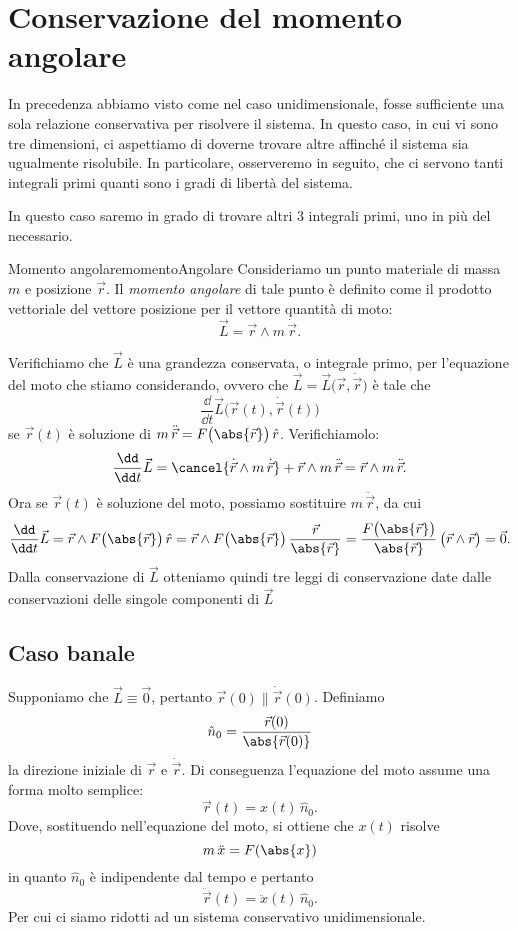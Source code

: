 \section{Conservazione del momento angolare}

In precedenza abbiamo visto come nel caso unidimensionale, fosse sufficiente una sola relazione conservativa per risolvere il sistema.
In questo caso, in cui vi sono tre dimensioni, ci aspettiamo di doverne trovare altre affinché il sistema sia ugualmente risolubile.
In particolare, osserveremo in seguito, che ci servono tanti integrali primi quanti sono i gradi di libertà del sistema.

In questo caso saremo in grado di trovare altri 3 integrali primi, uno in più del necessario.

\begin{defn}{Momento angolare}{momentoAngolare}
	Consideriamo un punto materiale di massa \(m\) e posizione \(\vec{r}\).
	Il \emph{momento angolare} di tale punto è definito come il prodotto vettoriale del vettore posizione per il vettore quantità di moto:
	\[
		\vec{L} = \vec{r} \wedge m\,\dot{\vec{r}}.
	\]
\end{defn}
\noindent
Verifichiamo che \(\vec{L}\) è una grandezza conservata, o integrale primo, per l'equazione del moto che stiamo considerando, ovvero che \(\vec{L}=\vec{L}\big(\vec{r},\dot{\vec{r}}\big)\) è tale che
\[
	\frac{\dd}{\dd t} \vec{L}\big(\vec{r}(t),\dot{\vec{r}}(t)\big)
\]
se \(\vec{r}(t)\) è soluzione di \(m\,\ddot{\vec{r}} = F\big(\abs{\vec{r}}\big)\,\hat{r}\).
Verifichiamolo:
\[
	\frac{\dd}{\dd t}\vec{L} = \cancel{\dot{\vec{r}} \wedge m\,\dot{\vec{r}}} + \vec{r} \wedge m\,\ddot{\vec{r}} = \vec{r} \wedge m\,\ddot{\vec{r}}.
\]
Ora se \(\vec{r}(t)\) è soluzione del moto, possiamo sostituire \(m\,\ddot{\vec{r}}\), da cui
\[
	\frac{\dd}{\dd t}\vec{L} = \vec{r} \wedge F\big(\abs{\vec{r}}\big)\,\hat{r} = \vec{r} \wedge F\big(\abs{\vec{r}}\big)\,\frac{\vec{r}}{\abs{\vec{r}}} = \frac{F\big(\abs{\vec{r}}\big)}{\abs{\vec{r}}}\,\big(\vec{r}\wedge \vec{r}\big) = \vec{0}.
\]
Dalla conservazione di \(\vec{L}\) otteniamo quindi tre leggi di conservazione date dalle conservazioni delle singole componenti di \(\vec{L}\)

\subsection{Caso banale}

Supponiamo che \(\vec{L} \equiv \vec{0}\), pertanto \(\vec{r}(0) \parallel \dot{\vec{r}}(0)\).
Definiamo
\[
	\hat{n}_0 = \frac{\vec{r}(0)}{\abs{\vec{r}(0)}}
\]
la direzione iniziale di \(\vec{r}\) e \(\dot{\vec{r}}\).
Di conseguenza l'equazione del moto assume una forma molto semplice:
\[
	\vec{r}(t) = x(t)\,\hat{n}_0.
\]
Dove, sostituendo nell'equazione del moto, si ottiene che \(x(t)\) risolve
\[
	m\,\ddot{x} = F(\abs{x})
\]
in quanto \(\hat{n}_0\) è indipendente dal tempo e pertanto
\[
	\ddot{\vec{r}}(t) = \ddot{x}(t)\,\hat{n}_0.
\]
Per cui ci siamo ridotti ad un sistema conservativo unidimensionale.

